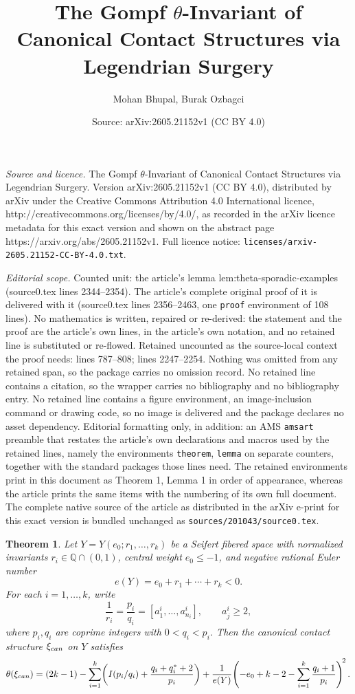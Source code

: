 \documentclass[10pt,a4paper]{amsart}
\title{The Gompf $\theta$-Invariant of Canonical Contact Structures via Legendrian Surgery}
\author{Mohan Bhupal, Burak Ozbagci}
\date{Source: arXiv:2605.21152v1 (CC BY 4.0)}
\newtheorem{theorem}{Theorem}
\newcommand{\Q}{\mathbb{Q}}
\begin{document}
\maketitle

\noindent\emph{Source and licence.} The Gompf $\theta$-Invariant of Canonical Contact Structures via Legendrian Surgery. Version arXiv:2605.21152v1 (CC BY 4.0), distributed by arXiv under the Creative Commons Attribution 4.0 International licence, http://creativecommons.org/licenses/by/4.0/, as recorded in the arXiv licence metadata for this exact version and shown on the abstract page https://arxiv.org/abs/2605.21152v1. Full licence notice: \texttt{licenses/arxiv-2605.21152-CC-BY-4.0.txt}.\par\smallskip

\noindent\textit{Editorial scope.} Counted unit: the article's lemma lem:theta-sporadic-examples (source0.tex lines 2344--2354). The article's complete original proof of it is delivered with it (source0.tex lines 2356--2463, one \texttt{proof} environment of 108 lines). No mathematics is written, repaired or re-derived: the statement and the proof are the article's own lines, in the article's own notation, and no retained line is substituted or re-flowed.  Retained uncounted as the source-local context the proof needs: lines 787--808; lines 2247--2254.  Nothing was omitted from any retained span, so the package carries no omission record.  No retained line contains a citation, so the wrapper carries no bibliography and no bibliography entry.  No retained line contains a figure environment, an image-inclusion command or drawing code, so no image is delivered and the package declares no asset dependency.  Editorial formatting only, in addition: an AMS \texttt{amsart} preamble that restates the article's own declarations and macros used by the retained lines, namely the environments \texttt{theorem}, \texttt{lemma} on separate counters, together with the standard packages those lines need.  The retained environments print in this document as Theorem 1, Lemma 1 in order of appearance, whereas the article prints the same items with the numbering of its own full document.  The complete native source of the article as distributed in the arXiv e-print for this exact version is bundled unchanged as \texttt{sources/201043/source0.tex}.
\begin{theorem}\label{thm:main-seifert}
Let $Y=Y(e_0;r_1,\dots,r_k)$ be a Seifert fibered space with
normalized invariants $r_i\in\Q\cap(0,1)$, central weight
$e_0\le -1$, and negative rational Euler number
\[
e(Y)=e_0+r_1+\cdots+r_k<0.
\]
For each $i=1,\dots,k$, write
\[
\frac{1}{r_i}=\frac{p_i}{q_i}=[a_1^i,\dots,a_{n_i}^i],
\qquad a_j^i\ge 2,
\]
where $p_i,q_i$ are coprime integers with $0<q_i<p_i$. Then the
canonical contact structure $\xi_{\rm can}$ on $Y$ satisfies
\[
\theta(\xi_{\rm can})
=
(2k-1)
-\sum_{i=1}^k\!\left(I(p_i/q_i)+\frac{q_i+q_i^*+2}{p_i}\right)
+\frac{1}{e(Y)}\!\left(-e_0+k-2-\sum_{i=1}^k\frac{q_i+1}{p_i}\right)^{\!2}.
\]
\end{theorem}
\end{document}
